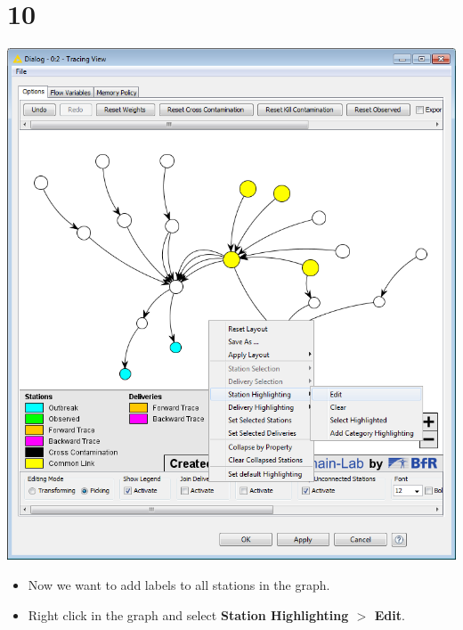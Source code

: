 \documentclass{beamer}
\begin{document}
\section{10}
\begin{frame}
	\begin{center}
  		\includegraphics[height=0.6\textheight]{10.png}
	\end{center}
	\begin{itemize}
		\item Now we want to add labels to all stations in the graph.
		\item Right click in the graph and select \textbf{Station Highlighting $>$ Edit}.
	\end{itemize}
\end{frame}
\end{document}
